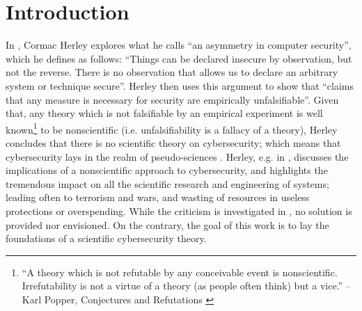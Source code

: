 \documentclass[conference]{IEEEtran}
\begin{document}
\section{Introduction}\label{sec:intro}
In \cite{Herley2016unfalsifiability}, Cormac Herley explores what he calls
``an asymmetry in computer security'', which he defines as follows: ``Things
can be declared insecure by observation, but not the reverse. There is no
observation that allows us to declare an arbitrary system or technique
secure''. Herley then uses this argument to show that ``claims that any measure
is necessary for security are empirically unfalsifiable''. Given that, any
theory which is not falsifiable by an empirical experiment is well
known\footnote{``A theory which is not refutable by any conceivable event is
nonscientific. Irrefutability is not a virtue of a theory (as people often
think) but a vice.'' -- Karl Popper, Conjectures and
Refutations \cite{popper1962conjectures}} to be nonscientific (i.e.
unfalsifiability is a fallacy of a theory), Herley concludes that there is no
scientific theory on cybersecurity; which means that cybersecurity lays in the
realm of pseudo-sciences \cite{Herley2016usenixvideo}.  Herley, e.g.
in \cite{Herley2017justifying}, discusses the implications of a
nonscientific approach to cybersecurity, and highlights the tremendous impact on
all the scientific research and engineering of systems; leading often to
terrorism and wars, and wasting of resources in useless protections or
overspending.  While the criticism is investigated
in \cite{Herley2016unfalsifiability}, no solution is provided nor envisioned.  On the
contrary, the goal of this work is to lay the foundations of a
scientific cybersecurity theory. 
\end{document}

